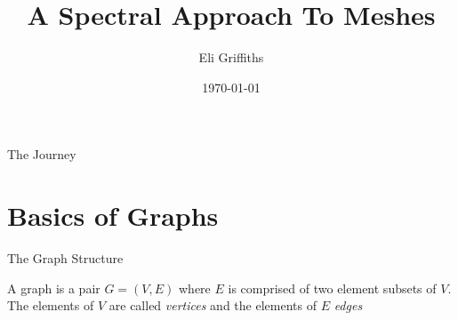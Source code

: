 \documentclass{beamer}
\author{Eli Griffiths}
\title{A Spectral Approach To Meshes}
\institute[UCI]{University of California, Irvine}
\date{\today}
\begin{document}
\maketitle

\begin{frame}{The Journey}
    \tableofcontents
\end{frame}

\section{Basics of Graphs}

\begin{frame}{The Graph Structure}
    \begin{definition}[Graph]
        A graph is a pair $G = (V, E)$ where $E$ is comprised of two element subsets of $V$. The elements of $V$ are called \emph{vertices} and the elements of $E$ \emph{edges}
    \end{definition}
    \pause
    \begin{center}
    \end{center}
\end{frame}
\end{document}
